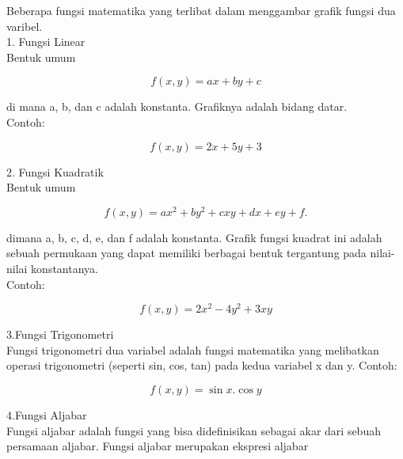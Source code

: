 \documentclass[12pt,arial,letterpaper]{book}
\begin{document}
\begin{eulercomment}
\begin{eulercomment}
\begin{eulercomment}
\begin{eulercomment}
\begin{eulercomment}
\begin{eulercomment}
\begin{eulercomment}
\begin{eulercomment}
\begin{eulercomment}
\begin{eulercomment}
\begin{eulercomment}
\begin{eulercomment}
\begin{eulercomment}
\begin{eulercomment}
\begin{eulercomment}
\begin{eulercomment}
\begin{eulercomment}
\begin{eulercomment}
\begin{eulercomment}
Beberapa fungsi matematika yang terlibat dalam menggambar grafik
fungsi dua varibel.\\
1. Fungsi Linear\\
Bentuk umum\\
\end{eulercomment}
\begin{eulerformula}
\[
f(x, y) = ax + by + c
\]
\end{eulerformula}
\begin{eulercomment}
di mana a, b, dan c adalah konstanta. Grafiknya adalah bidang datar.\\
Contoh:\\
\end{eulercomment}
\begin{eulerformula}
\[
f(x,y)=2x+5y+3
\]
\end{eulerformula}
\begin{eulercomment}
2. Fungsi Kuadratik\\
Bentuk umum\\
\end{eulercomment}
\begin{eulerformula}
\[
f(x, y) = ax^2 + by^2 + cxy + dx + ey + f.
\]
\end{eulerformula}
\begin{eulercomment}
dimana a, b, c, d, e, dan f adalah konstanta. Grafik fungsi kuadrat
ini adalah sebuah permukaan yang dapat memiliki berbagai bentuk
tergantung pada nilai-nilai konstantanya.\\
Contoh:\\
\end{eulercomment}
\begin{eulerformula}
\[
f(x,y)=2x^2-4y^2+3xy
\]
\end{eulerformula}
\begin{eulercomment}
3.Fungsi Trigonometri\\
Fungsi trigonometri dua variabel adalah fungsi matematika yang
melibatkan operasi trigonometri (seperti sin, cos, tan) pada kedua
variabel x dan y. Contoh:\\
\end{eulercomment}
\begin{eulerformula}
\[
f(x,y)=\sin{x}.\cos{y}
\]
\end{eulerformula}
\begin{eulercomment}
4.Fungsi Aljabar\\
Fungsi aljabar adalah fungsi yang bisa didefinisikan sebagai akar dari
sebuah persamaan aljabar. Fungsi aljabar merupakan ekspresi aljabar

\end{eulercomment}
\end{eulercomment}
\end{eulercomment}
\end{eulercomment}
\end{eulercomment}
\end{eulercomment}
\end{eulercomment}
\end{eulercomment}
\end{eulercomment}
\end{eulercomment}
\end{eulercomment}
\end{eulercomment}
\end{eulercomment}
\end{eulercomment}
\end{eulercomment}
\end{eulercomment}
\end{eulercomment}
\end{eulercomment}
\end{eulercomment}
\end{document}
